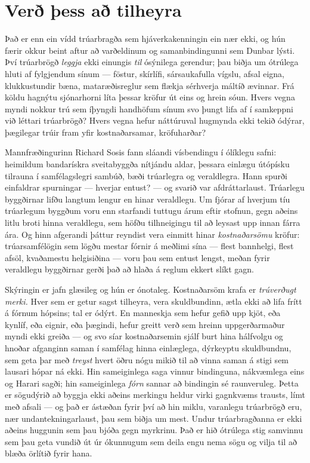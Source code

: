 \section*{Verð þess að tilheyra}

Það er enn ein vídd trúarbragða sem hjáverkakenningin ein nær ekki, og hún færir okkur beint aftur að varðeldinum og samanbindingunni sem Dunbar lýsti. Því trúarbrögð \emph{leggja} ekki einungis \emph{til} ósýnilega gerendur; þau biðja um ótrúlega hluti af fylgjendum sínum — föstur, skírlífi, sársaukafulla vígslu, afsal eigna, klukkustundir bæna, mataræðisreglur sem flækja sérhverja máltíð ævinnar. Frá köldu hagnýtu sjónarhorni líta þessar kröfur út eins og hrein sóun. Hvers vegna myndi nokkur trú sem íþyngdi handhöfum sínum svo þungt lifa af í samkeppni við léttari trúarbrögð? Hvers vegna hefur náttúruval hugmynda ekki tekið ódýrar, þægilegar trúir fram yfir kostnaðarsamar, kröfuharðar?

Mannfræðingurinn Richard Sosis fann sláandi vísbendingu í ólíklegu safni: heimildum bandarískra sveitabyggða nítjándu aldar, þessara einlægu útópísku tilrauna í samfélagslegri sambúð, bæði trúarlegra og veraldlegra. Hann spurði einfaldrar spurningar — hverjar entust? — og svarið var afdráttarlaust. Trúarlegu byggðirnar lifðu langtum lengur en hinar veraldlegu. Um fjórar af hverjum tíu trúarlegum byggðum voru enn starfandi tuttugu árum eftir stofnun, gegn aðeins litlu broti hinna veraldlegu, sem höfðu tilhneigingu til að leysast upp innan fárra ára. Og hinn afgerandi þáttur reyndist vera einmitt hinar \emph{kostnaðarsömu} kröfur: trúarsamfélögin sem lögðu mestar fórnir á meðlimi sína — flest bannhelgi, flest afsöl, kvaðamestu helgisiðina — voru þau sem entust lengst, meðan fyrir veraldlegu byggðirnar gerði það að hlaða á reglum ekkert slíkt gagn.

Skýringin er jafn glæsileg og hún er ónotaleg. Kostnaðarsöm krafa er \emph{trúverðugt merki.} Hver sem er getur sagst tilheyra, vera skuldbundinn, ætla ekki að lifa frítt á fórnum hópsins; tal er ódýrt. En manneskja sem hefur gefið upp kjöt, eða kynlíf, eða eignir, eða þægindi, hefur greitt verð sem hreinn uppgerðarmaður myndi ekki greiða — og svo síar kostnaðarsemin sjálf burt hina hálfvolgu og hnoðar afganginn saman í samfélag hinna einlæglega, dýrkeyptu skuldbundnu, sem geta þar með \emph{treyst} hvert öðru nógu mikið til að vinna saman á stigi sem lausari hópar ná ekki. Hin sameiginlega saga vinnur bindinguna, nákvæmlega eins og Harari sagði; hin sameiginlega \emph{fórn} sannar að bindingin sé raunveruleg. Þetta er sögudýrið að byggja ekki aðeins merkingu heldur virki gagnkvæms trausts, límt með afsali — og það er ástæðan fyrir því að hin miklu, varanlegu trúarbrögð eru, nær undantekningarlaust, þau sem biðja um mest. Undur trúarbragðanna er ekki aðeins huggunin sem þau bjóða gegn myrkrinu. Það er hið ótrúlega stig samvinnu sem þau geta vundið út úr ókunnugum sem deila engu nema sögu og vilja til að blæða örlítið fyrir hana.

